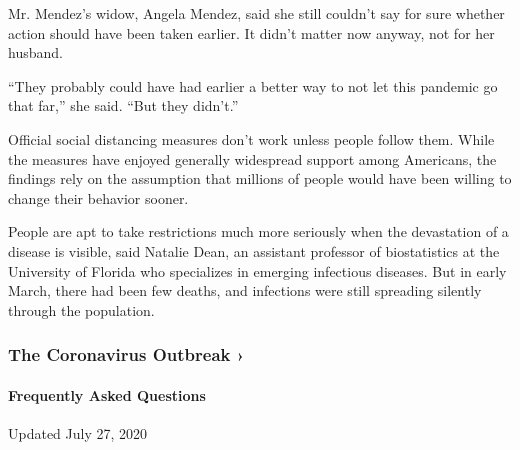 Mr. Mendez's widow, Angela Mendez, said she still couldn't say for sure
whether action should have been taken earlier. It didn't matter now
anyway, not for her husband.

``They probably could have had earlier a better way to not let this
pandemic go that far,'' she said. ``But they didn't.''

Official social distancing measures don't work unless people follow
them. While the measures have enjoyed generally widespread support among
Americans, the findings rely on the assumption that millions of people
would have been willing to change their behavior sooner.

People are apt to take restrictions much more seriously when the
devastation of a disease is visible, said Natalie Dean, an assistant
professor of biostatistics at the University of Florida who specializes
in emerging infectious diseases. But in early March, there had been few
deaths, and infections were still spreading silently through the
population.

\href{https://www.nytimes.com/news-event/coronavirus?action=click\&pgtype=Article\&state=default\&region=MAIN_CONTENT_3\&context=storylines_faq}{}

\hypertarget{the-coronavirus-outbreak-}{%
\subsubsection{The Coronavirus Outbreak
›}\label{the-coronavirus-outbreak-}}

\hypertarget{frequently-asked-questions}{%
\paragraph{Frequently Asked
Questions}\label{frequently-asked-questions}}

Updated July 27, 2020

